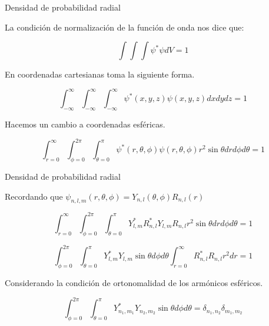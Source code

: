 \begin{frame}{Densidad de probabilidad radial}

    La condición de normalización de la función de onda nos dice que:

    \begin{equation}
        \int \int \int \psi^{*} \psi dV = 1
    \end{equation}

    En coordenadas cartesianas toma la siguiente forma.

    \begin{equation}
        \displaystyle\int_{-\infty}^{\infty} 
        \displaystyle\int_{-\infty}^{\infty} 
        \displaystyle\int_{-\infty}^{\infty} 
        \psi^{*}(x,y,z) \psi(x,y,z) dxdydz = 1
    \end{equation}

    Hacemos un cambio a coordenadas esféricas.

    \begin{equation}
        \displaystyle\int_{r=0}^{\infty} 
        \displaystyle\int_{\phi=0}^{2\pi} 
        \displaystyle\int_{\theta=0}^{\pi} 
        \psi^{*}(r,\theta,\phi) \psi(r,\theta,\phi) 
        r^2 \sin{\theta} dr d\phi d\theta = 1
    \end{equation}

\end{frame}

\begin{frame}{Densidad de probabilidad radial}

    Recordando que $\psi_{n,l,m} (r, \theta, \phi) = Y_{n,l}(\theta,\phi) R_{n,l} (r) $

    \begin{equation}
        \displaystyle\int_{r=0}^{\infty} 
        \displaystyle\int_{\phi=0}^{2\pi} 
        \displaystyle\int_{\theta=0}^{\pi} 
        Y^{*}_{l,m} R_{n,l}^{*}
        Y_{l,m} R_{n,l}
        r^2 \sin{\theta} dr d\phi d\theta = 1
    \end{equation}

    \begin{equation}
        \displaystyle\int_{\phi=0}^{2\pi} 
        \displaystyle\int_{\theta=0}^{\pi} 
        Y^{*}_{l,m} Y_{l,m}
        \sin{\theta} d\phi d\theta
        \displaystyle\int_{r=0}^{\infty} 
        R_{n,l}^{*} R_{n,l}
        r^2  dr  = 1
    \end{equation}

    Considerando la condición de ortonomalidad de los armónicos esféricos. \cite{arfken1999mathematical}

    \begin{equation}
        \displaystyle\int_{\phi=0}^{2\pi} 
        \displaystyle\int_{\theta=0}^{\pi} 
        Y^{*}_{n_1,m_1} Y_{n_2,m_2}
        \sin{\theta} d\phi d\theta
        = 
        \delta_{n_1 , n_2} \delta_{m_1 , m_2}
    \end{equation}

\end{frame}


